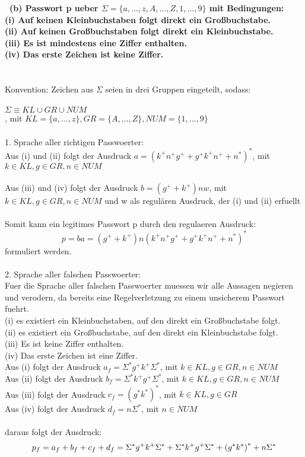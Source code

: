 \documentclass{article}
\newcommand{\gap}{\null\ \\ \\}
\newcommand{\task}[1]{\textbf{#1} \\ \gap}
\begin{document}
\task{\
    (b) Passwort p ueber $\Sigma = \{a,\ldots,z,A,\ldots,Z,1,\ldots,9\}$ 
    mit Bedingungen:\\
    (i) Auf keinen Kleinbuchstaben folgt direkt ein Großbuchstabe.\\
    (ii) Auf keinen Großbuchstaben folgt direkt ein Kleinbuchstabe.\\
    (iii) Es ist mindestens eine Ziffer enthalten.\\
    (iv) Das erste Zeichen ist keine Ziffer.
    }
Konvention: Zeichen aus $\Sigma$ seien in drei Gruppen eingeteilt, sodass:\\
\\
$\Sigma \equiv KL \cup GR \cup NUM$\\
, mit $
    KL = \{a,\ldots,z\}
    , GR = \{A,\ldots,Z\}
    , NUM = \{1,\ldots,9\}
    $\\
\\
1. Sprache aller richtigen Passwoerter:\\
Aus {(i)} und {(ii)} folgt der Ausdruck $a = {(k^+n^+g^+ + g^+k^+n^+ + n^*)}^*$, 
    mit $ k \in KL, g \in GR, n \in NUM$\\
\\
Aus {(iii)} und {(iv)} folgt der Ausdruck $b = {(g^+ + k^+)}nw$,
    mit $ k \in KL, g \in GR, n \in NUM$ und w als regulären Ausdruck,
    der {(i)} und {(ii)} erfuellt\\
\\
Somit kann ein legitimes Passwort p durch den regulaeren Ausdruck:\\
\[
    p = ba = {(g^+ + k^+)}n {(k^+n^+g^+ + g^+k^+n^+ + n^*)}^*
\]
formuliert werden.\\
\ \\
2. Sprache aller falschen Passwoerter:\\
Fuer die Sprache aller falschen Passwoerter muessen wir alle Aussagen negieren
und verodern, da bereits eine Regelverletzung zu einem unsicherem Passwort
fuehrt.\\
(i) es existiert ein Kleinbuchstaben, auf den direkt ein Großbuchstabe folgt.\\
(ii) es existiert ein Großbuchstabe, auf den direkt ein Kleinbuchstabe folgt.\\
(iii) Es ist keine Ziffer enthalten.\\
(iv) Das erste Zeichen ist eine Ziffer.
\\
Aus {(i)} folgt der Ausdruck $a_f = \Sigma^*g^+k^+\Sigma^*$,
    mit $ k \in KL, g \in GR, n \in NUM$\\
Aus {(ii)} folgt der Ausdruck $b_f = \Sigma^*k^+g^+\Sigma^*$,
    mit $ k \in KL, g \in GR, n \in NUM$\\
Aus {(iii)} folgt der Ausdruck $c_f = {(g^*k^*)}^*$,
    mit $ k \in KL, g \in GR$\\
Aus {(iv)} folgt der Ausdruck $d_f = n\Sigma^*$,
    mit $n \in NUM$\\
\\
daraus folgt der Ausdruck:\\
\[
    p_f = a_f + b_f + c_f + d_f\\
        = \Sigma^*g^+k^+\Sigma^* 
            + \Sigma^*k^+g^+\Sigma^* 
            + {(g^*k^*)}^* + n\Sigma^*
\]\\
\gap\
\end{document}
